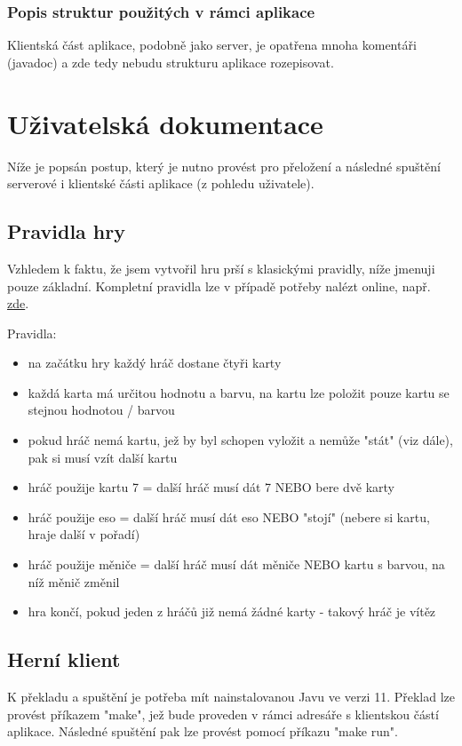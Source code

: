 \documentclass[12pt, a4paper, pdftex, czech, titlepage]{report}
\begin{document}
\subsection{Popis struktur použitých v rámci aplikace}
Klientská část aplikace, podobně jako server, je opatřena mnoha komentáři (javadoc) a zde tedy nebudu strukturu aplikace rozepisovat.

\chapter{Uživatelská dokumentace}
Níže je popsán postup, který je nutno provést pro přeložení a následné spuštění serverové i klientské části aplikace (z pohledu uživatele).

\section{Pravidla hry}
Vzhledem k faktu, že jsem vytvořil hru prší s klasickými pravidly, níže jmenuji pouze základní. Kompletní pravidla lze v případě potřeby nalézt online, např. \href{https://www.tipmag.cz/navod-na-hru-prsi}{zde}.

Pravidla:
\begin{itemize}
\item na začátku hry každý hráč dostane čtyři karty
\item každá karta má určitou hodnotu a barvu, na kartu lze položit pouze kartu se stejnou hodnotou / barvou
\item pokud hráč nemá kartu, jež by byl schopen vyložit a nemůže "stát" (viz dále), pak si musí vzít další kartu
\item hráč použije kartu 7 = další hráč musí dát 7 NEBO bere dvě karty
\item hráč použije eso = další hráč musí dát eso NEBO "stojí" (nebere si kartu, hraje další v pořadí)
\item hráč použije měniče = další hráč musí dát měniče NEBO kartu s barvou, na níž měnič změnil
\item hra končí, pokud jeden z hráčů již nemá žádné karty - takový hráč je vítěz
\end{itemize}

\section{Herní klient}
K překladu a spuštění je potřeba mít nainstalovanou Javu ve verzi 11. Překlad lze provést příkazem "make", jež bude proveden v rámci adresáře s klientskou částí aplikace.
Následné spuštění pak lze provést pomocí příkazu "make run".
\end{document}
